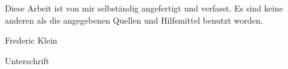 
%



	
\restoregeometry


\clearpage
\vspace*{\fill}
\begin{center}
	\begin{minipage}{.8\textwidth}
		\thispagestyle{empty} %
		Diese Arbeit ist von mir selbst\"andig angefertigt und verfasst. Es sind keine anderen als die angegebenen Quellen und Hilfsmittel benutzt worden.\par
		\vspace{1cm}
		Frederic Klein \dotfill \par
		Unterschrift
	\end{minipage}
\end{center}
\vfill %
\clearpage



